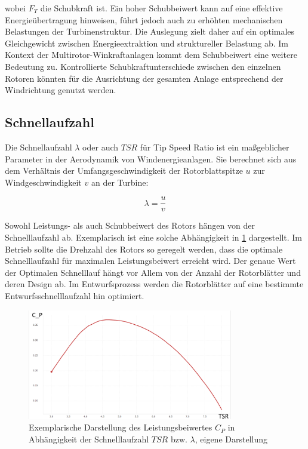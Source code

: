 wobei \( F_T \) die Schubkraft ist. Ein hoher Schubbeiwert kann auf eine effektive Energieübertragung hinweisen, führt jedoch auch zu erhöhten mechanischen Belastungen der Turbinenstruktur. Die Auslegung zielt daher auf ein optimales Gleichgewicht zwischen Energieextraktion und struktureller Belastung ab. Im Kontext der Multirotor-Winkraftanlagen kommt dem Schubbeiwert eine weitere Bedeutung zu. Kontrollierte Schubkraftunterschiede zwischen den einzelnen Rotoren könnten für die Ausrichtung der gesamten Anlage entsprechend der Windrichtung genutzt werden. 

\subsection{Schnellaufzahl}
Die Schnellaufzahl \( \lambda \) oder auch \( TSR \) für Tip Speed Ratio ist ein maßgeblicher Parameter in der Aerodynamik von Windenergieanlagen. Sie berechnet sich aus dem Verhältnis der Umfangsgeschwindigkeit der Rotorblattspitze \( u \) zur Windgeschwindigkeit \( v \) an der Turbine:

\begin{equation}
\lambda = \frac{u}{v}
\end{equation}

Sowohl Leistungs- als auch Schubbeiwert des Rotors hängen von der Schnelllaufzahl ab. Exemplarisch ist eine solche Abhängigkeit in \cref{fig:leistung_vs_TSR} dargestellt. Im Betrieb sollte die Drehzahl des Rotors so geregelt werden, dass die optimale Schnelllaufzahl für maximalen Leistungsbeiwert erreicht wird. Der genaue Wert der Optimalen Schnelllauf hängt vor Allem von der Anzahl der Rotorblätter und deren Design ab. Im Entwurfsprozess werden die Rotorblätter auf eine bestimmte Entwurfsschnelllaufzahl hin optimiert.

\begin{figure}[htbp] %
    \centering %
    \includegraphics[width=0.8\textwidth]{figures/leistung_vs_TSR.png} %
    \caption{Exemplarische Darstellung des Leistungsbeiwertes \( C_P\) in Abhängigkeit der Schnelllaufzahl \(TSR\) bzw. \( \lambda\), eigene Darstellung} %
    \label{fig:leistung_vs_TSR} %
\end{figure}

